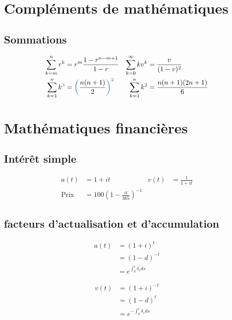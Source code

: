 \documentclass[10pt, french]{article}
\begin{document}
\begin{multicols*}{2}

\section*{Compléments de mathématiques}

\subsection*{Sommations}
\begin{align*}
\sum_{k = m}^{n} r^k &= r^{m} \frac{1 - r^{n - m + 1}}{1 - r} &
\sum_{k = 0}^{\infty}k v^k &= \frac{v}{(1 - v)^2} \\
\sum_{k = 1}^{n}k^{\textcolor{teal}{3}} &= \textcolor{teal}{\bigg(}\frac{n(n + 1)}{2}\textcolor{teal}{\bigg)^{2}} &
\sum_{k = 1}^{n}k^2 &= \frac{n(n + 1)(2n + 1)}{6} \\
\end{align*}

\section*{Mathématiques financières}

\subsection*{Intérêt simple}
\begin{align*}
	a(t)
		&=	1 + it &
	v(t)
		&=	\frac{1}{1 + it} \\
	\text{Prix}
		&=	100 \left( 1 - \frac{it}{365} \right)^{-1}
\end{align*}

\subsection*{facteurs d'actualisation et d'accumulation}
\begin{minipage}[t]{.5\linewidth}
\begin{align*}
	a(t) 
		&= 	(1 + i)^{t} 		\\
		&= 	(1 - d)^{-t}	\\
		&= 	e^{\int_{0}^{t} \delta_s ds} 
\end{align*}
\end{minipage}
\begin{minipage}[t]{.5\linewidth}
	\begin{align*}
	v(t) 
		&=	(1 + i)^{-t}		\\
		&=	(1 - d)^{t}	 	\\
		&= 	e^{-\int_{0}^{t} \delta_s ds} 
\end{align*}
\end{minipage}


\end{multicols*}
\end{document}
